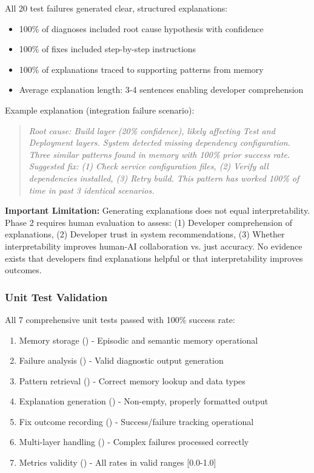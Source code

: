 \documentclass[11pt]{article}
\begin{document}
All 20 test failures generated clear, structured explanations:

\begin{itemize}
    \item 100\% of diagnoses included root cause hypothesis with confidence
    \item 100\% of fixes included step-by-step instructions
    \item 100\% of explanations traced to supporting patterns from memory
    \item Average explanation length: 3-4 sentences enabling developer comprehension
\end{itemize}

Example explanation (integration failure scenario):
\begin{quote}
\textit{Root cause: Build layer (20\% confidence), likely affecting Test and Deployment layers. System detected missing dependency configuration. Three similar patterns found in memory with 100\% prior success rate. Suggested fix: (1) Check service configuration files, (2) Verify all dependencies installed, (3) Retry build. This pattern has worked 100\% of time in past 3 identical scenarios.}
\end{quote}

\textbf{Important Limitation:} Generating explanations does not equal interpretability. Phase 2 requires human evaluation to assess: (1) Developer comprehension of explanations, (2) Developer trust in system recommendations, (3) Whether interpretability improves human-AI collaboration vs. just accuracy. No evidence exists that developers find explanations helpful or that interpretability improves outcomes.

\subsubsection{Unit Test Validation}

All 7 comprehensive unit tests passed with 100\% success rate:

\begin{enumerate}
    \item Memory storage (\checkmark) - Episodic and semantic memory operational
    \item Failure analysis (\checkmark) - Valid diagnostic output generation
    \item Pattern retrieval (\checkmark) - Correct memory lookup and data types
    \item Explanation generation (\checkmark) - Non-empty, properly formatted output
    \item Fix outcome recording (\checkmark) - Success/failure tracking operational
    \item Multi-layer handling (\checkmark) - Complex failures processed correctly
    \item Metrics validity (\checkmark) - All rates in valid ranges [0.0-1.0]
\end{enumerate}
\end{document}
